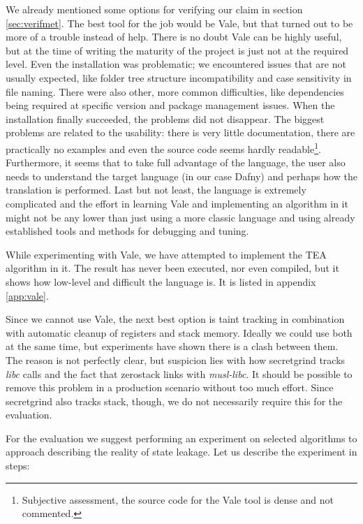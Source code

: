 \documentclass[a4paper,10pt,openright]{memoir}
\newcommand{\term}[1]{\textit{#1}}
\begin{document}
We already mentioned some options for verifying our claim in section 
\ref{sec:verifmet}. The best tool for the job would be Vale, but that 
turned out to be more of a trouble instead of help. There is no doubt 
Vale can be highly useful, but at the time of writing the maturity of 
the project is just not at the required level. Even the installation 
was problematic; we encountered issues that are not usually expected, 
like folder tree structure incompatibility and case sensitivity in file 
naming. There were also other, more common difficulties, like 
dependencies being required at specific version and package management 
issues. When the installation finally succeeded, the problems did not 
disappear. The biggest problems are related to the usability: there is 
very little documentation, there are practically no examples and even 
the source code seems hardly readable\footnote{Subjective assessment, 
the source code for the Vale tool is dense and not commented.}. 
Furthermore, it seems that to take full advantage of the language, the 
user also needs to understand the target language (in our case Dafny) 
and perhaps how the translation is performed. Last but not least, the 
language is extremely complicated and the effort in learning Vale and 
implementing an algorithm in it might not be any lower than just using 
a more classic language and using already established tools and methods 
for debugging and tuning.

While experimenting with Vale, we have attempted to implement the TEA 
algorithm in it. The result has never been executed, nor even compiled, 
but it shows how low-level and difficult the language is. It is listed 
in appendix \ref{app:vale}.

Since we cannot use Vale, the next best option is taint tracking in 
combination with automatic cleanup of registers and stack memory. 
Ideally we could use both at the same time, but experiments have shown 
there is a clash between them. The reason is not perfectly clear, but 
suspicion lies with how secretgrind tracks \term{libc} calls and 
the fact that zerostack links with \term{musl-libc}. It should 
be possible to remove this problem in a production scenario without too 
much effort. Since secretgrind also tracks stack, though, we do 
not necessarily require this for the evaluation.

For the evaluation we suggest performing an experiment on selected 
algorithms to approach describing the reality of state leakage. Let us 
describe the experiment in steps:
\end{document}
